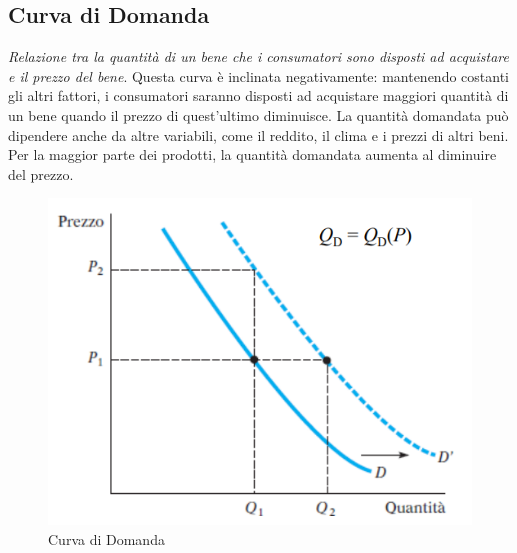\documentclass[12pt]{article}
\begin{document}
\subsection{Curva di Domanda}
\textit{Relazione tra la quantità di un bene che i consumatori sono disposti ad acquistare e il prezzo del bene}. Questa curva è inclinata negativamente: mantenendo costanti gli altri fattori, i consumatori saranno disposti ad acquistare maggiori quantità di un bene quando il
prezzo di quest’ultimo diminuisce. La quantità domandata può dipendere anche da altre variabili, come il reddito, il clima e i prezzi di altri beni. Per la maggior parte dei prodotti, la quantità domandata aumenta al diminuire del prezzo.
\FloatBarrier
\begin{figure}[!htb]
    \centering
    \includegraphics[width=1\textwidth]{images/domanda.png}
    \caption{Curva di Domanda}
\end{figure}
\end{document}
